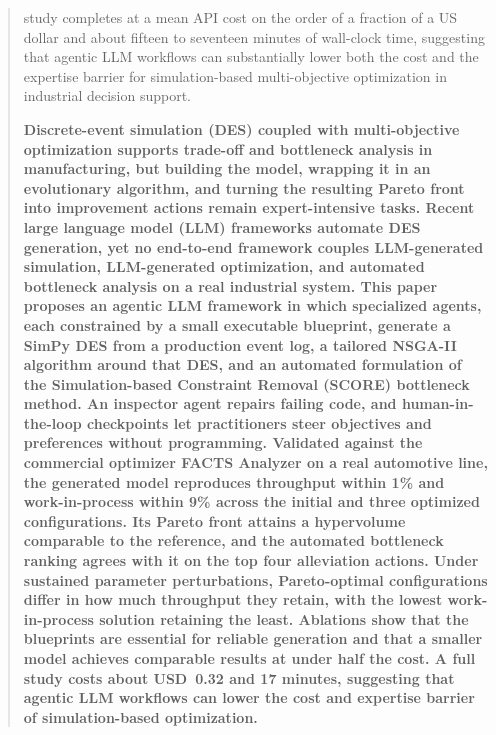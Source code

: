 \documentclass[a4paper,fleqn]{cas-sc}
\begin{document}
\begin{abstract}
  study completes at a mean API cost on the order of a fraction of a US dollar and about fifteen to seventeen minutes of wall-clock time, suggesting that agentic LLM workflows can substantially lower both the cost and the expertise barrier for simulation-based multi-objective optimization in industrial decision support. %


 
\textbf{Discrete-event simulation (DES) coupled with multi-objective optimization supports trade-off and bottleneck analysis in manufacturing, but building the model, wrapping it in an evolutionary algorithm, and turning the resulting Pareto front into improvement actions remain expert-intensive tasks. Recent large language model (LLM) frameworks automate DES generation, yet no end-to-end framework couples LLM-generated simulation, LLM-generated optimization, and automated bottleneck analysis on a real industrial system. This paper proposes an agentic LLM framework in which specialized agents, each constrained by a small executable blueprint, generate a SimPy DES from a production event log, a tailored NSGA-II algorithm around that DES, and an automated formulation of the Simulation-based Constraint Removal (SCORE) bottleneck method. An inspector agent repairs failing code, and human-in-the-loop checkpoints let practitioners steer objectives and preferences without programming. Validated against the commercial optimizer FACTS Analyzer on a real automotive line, the generated model reproduces throughput within 1\% and work-in-process within 9\% across the initial and three optimized configurations. Its Pareto front attains a hypervolume comparable to the reference, and the automated bottleneck ranking agrees with it on the top four alleviation actions. Under sustained parameter perturbations, Pareto-optimal configurations differ in how much throughput they retain, with the lowest work-in-process solution retaining the least. Ablations show that the blueprints are essential for reliable generation and that a smaller model achieves comparable results at under half the cost. A full study costs about USD~0.32 and 17 minutes, suggesting that agentic LLM workflows can lower the cost and expertise barrier of simulation-based optimization.}

\end{abstract}

\end{document}
